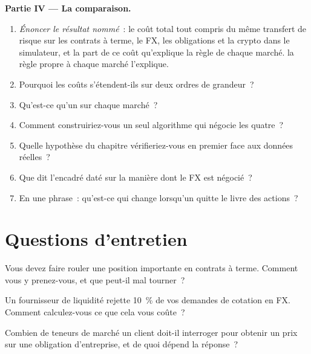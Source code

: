 \begin{problem}
\medskip\noindent\textbf{Partie IV --- La comparaison.}
\begin{enumerate}[resume]
\item \emph{Énoncer le résultat nommé}~: le coût total tout compris du même transfert de risque sur les contrats à terme, le FX, les obligations et la crypto dans le simulateur, et la part de ce coût qu'explique la règle de chaque marché.
la règle propre à chaque marché l'explique.
\item Pourquoi les coûts s'étendent-ils sur deux ordres de grandeur~?
\item Qu'est-ce qu'un  sur chaque marché~?
\item Comment construiriez-vous un seul algorithme qui négocie les quatre~?
\item Quelle hypothèse du chapitre vérifieriez-vous en premier face aux données réelles~?
\item Que dit l'encadré daté sur la manière dont le FX est négocié~?
\item En une phrase~: qu'est-ce qui change lorsqu'un  quitte le livre des actions~?
\end{enumerate}
\end{problem}

\section{Questions d'entretien}

\begin{interviewq}\label{iq:mx:execution-beyond-equities:1}
Vous devez faire rouler une position importante en contrats à terme. Comment vous y prenez-vous, et que peut-il mal tourner~?
\end{interviewq}

\begin{interviewq}\label{iq:mx:execution-beyond-equities:2}
Un fournisseur de liquidité rejette 10~\% de vos demandes de cotation en FX. Comment calculez-vous ce que cela vous coûte~?
\end{interviewq}

\begin{interviewq}\label{iq:mx:execution-beyond-equities:3}
Combien de teneurs de marché un client doit-il interroger pour obtenir un prix sur une obligation d'entreprise, et de quoi dépend la réponse~?
\end{interviewq}

